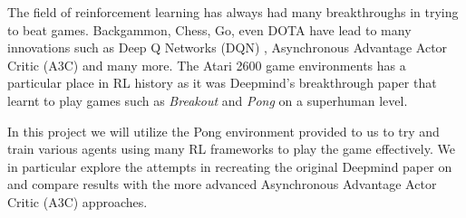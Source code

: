The field of reinforcement learning has always had many breakthroughs in trying to beat games. Backgammon, Chess, Go, even DOTA have lead to many innovations such as Deep Q Networks (DQN) \cite{Atari_Breakout}, Asynchronous Advantage Actor Critic (A3C) \cite{A3C} and many more.
The Atari 2600 game environments has a particular place in RL history as it was Deepmind's breakthrough paper that learnt to play games such as \textit{Breakout} and \textit{Pong} on a superhuman level.


\medskip 
\noindent
In this project we will utilize the Pong environment provided to us to try and train various agents using many RL frameworks to play the game effectively. We in particular explore the attempts in recreating the original Deepmind paper on and compare results with the more advanced Asynchronous Advantage Actor Critic (A3C) approaches.